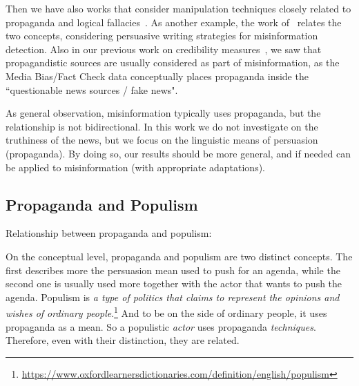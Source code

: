 Then we have also works that consider manipulation techniques closely related to propaganda and logical fallacies~\citep{roozenbeek2022countering}.
As another example, the work of~\citet{romain2022misinformation} relates the two concepts, considering persuasive writing strategies for misinformation detection.
Also in our previous work on credibility measures~\citep{mensio2019news}, %
we saw that propagandistic sources are usually considered as part of misinformation, as the Media Bias/Fact Check data conceptually places propaganda inside the ``questionable news sources / fake news".


As general observation, misinformation typically uses propaganda, but the relationship is not bidirectional. In this work we do not investigate on the truthiness of the news, but we focus on the linguistic means of persuasion (propaganda).
By doing so, our results should be more general, and if needed can be applied to misinformation (with appropriate adaptations). 

\subsection{Propaganda and Populism}
\label{sec:lit_related_populism}

Relationship between propaganda and populism:

On the conceptual level, propaganda and populism are two distinct concepts. The first describes more the persuasion mean used to push for an agenda, while the second one is usually used more together with the actor that wants to push the agenda. Populism is \emph{a type of politics that claims to represent the opinions and wishes of ordinary people}.\footnote{\url{https://www.oxfordlearnersdictionaries.com/definition/english/populism}}
And to be on the side of ordinary people, it uses propaganda as a mean. So a populistic \emph{actor} uses propaganda \emph{techniques}. Therefore, even with their distinction, they are related.


